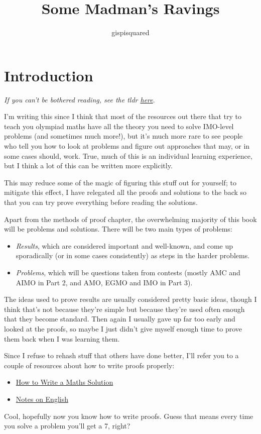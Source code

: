 \documentclass{amsart}
\title{Some Madman's Ravings}
\author{gispisquared}
\begin{document}
\maketitle
\tableofcontents
\newpage
\section*{Introduction}
\emph{If you can't be bothered reading, see the tldr \hyperlink{tldr}{here}}.

I'm writing this since I think that most of the resources out there that try to
teach you olympiad maths have all the theory you need to solve IMO-level
problems (and sometimes much more!), but it's much more rare to see people who
tell you how to look at problems and figure out approaches that may, or in some
cases should, work. True, much of this is an individual learning experience, but
I think a lot of this can be written more explicitly.

This may reduce some of the magic of figuring this stuff out for yourself; to
mitigate this effect, I have relegated all the proofs and solutions to
the back so that you can try prove everything before reading the solutions.

Apart from the methods of proof chapter, the overwhelming majority of this book
will be problems and solutions. There will be two main types of problems:
\begin{itemize}
  \item \emph{Results}, which are considered important and well-known, and come
    up sporadically (or in some cases consistently) as steps in the harder
    problems.
  \item \emph{Problems}, which will be questions taken from contests (mostly AMC
    and AIMO in Part 2, and AMO, EGMO and IMO in Part 3).
\end{itemize}
The ideas used to prove results are usually considered pretty
basic ideas, though I think that's not because they're simple but because
they're used often enough that they become standard. Then again I usually gave
up far too early and looked at the proofs, so maybe I just didn't give myself
enough time to prove them back when I was learning them.

Since I refuse to rehash stuff that others have done better, I'll refer you to a
couple of resources about how to write proofs properly:
\begin{itemize}
  \item
    \href{https://artofproblemsolving.com/news/articles/how-to-write-a-solution}
    {How to Write a Maths Solution}
  \item \href{https://web.evanchen.cc/handouts/english/english.pdf}{Notes on
    English}
\end{itemize}
Cool, hopefully now you know how to write proofs. Guess that means every time
you solve a problem you'll get a 7, right?
\end{document}
